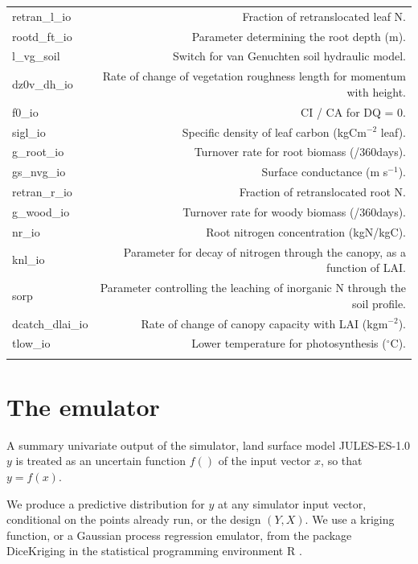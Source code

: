 \documentclass[gmd, manuscript]{copernicus}
\begin{document}
\begin{table}[t]
\begin{tabular}{l r}
  retran\_l\_io & Fraction of retranslocated leaf N.\\ 
  rootd\_ft\_io & Parameter determining the root depth (m). \\ 
  l\_vg\_soil & Switch for van Genuchten soil hydraulic model. \\ 
  dz0v\_dh\_io & Rate of change of vegetation roughness length for momentum with height. \\ 
  f0\_io & CI / CA for DQ = 0. \\ 
  sigl\_io & Specific density of leaf carbon (kgCm$^{-2}$ leaf).\\ 
  g\_root\_io & Turnover rate for root biomass (/360days). \\ 
  gs\_nvg\_io & Surface conductance (m s$^{-1}$). \\ 
  retran\_r\_io & Fraction of retranslocated root N.\\ 
  g\_wood\_io &  Turnover rate for woody biomass (/360days).\\ 
  nr\_io &  Root nitrogen concentration (kgN/kgC).\\ 
  knl\_io & Parameter for decay of nitrogen through the canopy, as a function of LAI.\\ 
  sorp & Parameter controlling the leaching of inorganic N through the soil profile. \\ 
  dcatch\_dlai\_io &Rate of change of canopy capacity with LAI (kgm$^{-2}$).  \\ 
  tlow\_io & Lower temperature for photosynthesis ($^\circ$C).\\  
\bottomhline
\end{tabular}
\belowtable{} %

\end{table}


\section{The emulator}\label{app:emulator}

A summary univariate output of the simulator, land surface model JULES-ES-1.0 $y$ is treated as an uncertain function $f()$ of the input vector $x$, so that $y = f(x)$. 

We produce a predictive distribution for $y$ at any simulator input vector, conditional on the points already run, or the design $(Y, X)$. We use a kriging function, or a Gaussian process regression emulator, from the package DiceKriging \citep{roustant2012dicekriging} in the statistical programming environment R \citep{Rcore2016}.
\end{document}

